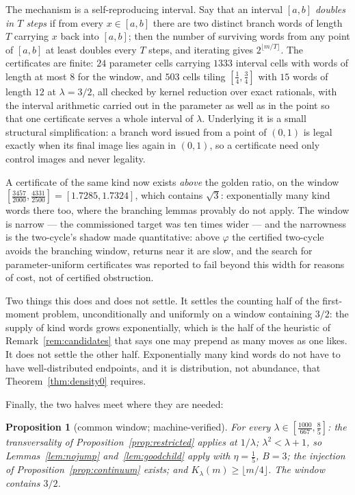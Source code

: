 \documentclass[11pt,reqno]{amsart}
\theoremstyle{plain}
\newtheorem{proposition}[theorem]{Proposition}
\theoremstyle{definition}
\theoremstyle{remark}
\begin{document}
The mechanism is a self-reproducing interval. Say that an interval
$[a,b]$ \emph{doubles in $T$ steps} if from every $x\in[a,b]$ there are two
distinct branch words of length $T$ carrying $x$ back into $[a,b]$; then the
number of surviving words from any point of $[a,b]$ at least doubles every $T$
steps, and iterating gives $2^{\lfloor m/T\rfloor}$. The certificates are
finite: $24$ parameter cells carrying $1333$ interval cells with words of
length at most $8$ for the window, and $503$ cells tiling $[\tfrac14,\tfrac34]$
with $15$ words of length $12$ at $\lambda=3/2$, all checked by kernel
reduction over exact rationals, with the interval arithmetic carried out in the
parameter as well as in the point so that one certificate serves a whole
interval of $\lambda$. Underlying it is a small structural simplification: a
branch word issued from a point of $(0,1)$ is legal exactly when its final
image lies again in $(0,1)$, so a certificate need only control images and
never legality.

A certificate of the same kind now exists \emph{above} the golden ratio, on
the window $[\tfrac{3457}{2000},\tfrac{4331}{2500}]=[1.7285,1.7324]$, which
contains $\sqrt3$: exponentially many kind words there too, where the
branching lemmas provably do not apply. The window is narrow --- the
commissioned target was ten times wider --- and the narrowness is the
two-cycle's shadow made quantitative: above $\varphi$ the certified two-cycle
avoids the branching window, returns near it are slow, and the search for
parameter-uniform certificates was reported to fail beyond this width for
reasons of cost, not of certified obstruction.

Two things this does and does not settle. It settles the counting half of the
first-moment problem, unconditionally and uniformly on a window containing
$3/2$: the supply of kind words grows exponentially, which is the half of the
heuristic of Remark~\ref{rem:candidates} that says one may prepend as many
moves as one likes. It does not settle the other half. Exponentially many kind
words do not have to have well-distributed endpoints, and it is distribution,
not abundance, that Theorem~\ref{thm:density0} requires.

Finally, the two halves meet where they are needed:

\begin{proposition}[common window; machine-verified]\label{prop:commonwindow}
For every $\lambda\in[\tfrac{1000}{667},\tfrac85]$: the transversality of
Proposition~\ref{prop:restricted} applies at $1/\lambda$;
$\lambda^2<\lambda+1$, so Lemmas~\ref{lem:nojump} and~\ref{lem:goodchild}
apply with $\eta=\tfrac15$, $B=3$; the injection of
Proposition~\ref{prop:continuum} exists; and
$K_\lambda(m)\geq\lfloor m/4\rfloor$. The window contains $3/2$.
\end{proposition}
\end{document}
